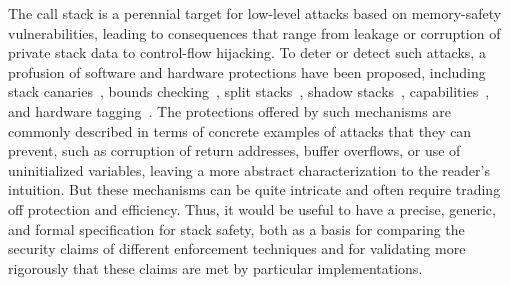 \documentclass[acmsmall,review,anonymous]{acmart}\settopmatter{printfolios=true,printccs=false,printacmref=false}
\begin{document}
The call stack is a perennial target for low-level attacks
based on memory-safety vulnerabilities, leading to consequences
that range from leakage or corruption of private stack data to
control-flow hijacking. To deter or detect such attacks, a profusion of
software and hardware protections have been proposed,
%
including stack canaries~\citep{Cowan+98},
bounds checking~\citep{NagarakatteZMZ09,NagarakatteZMZ10,DeviettiBMZ08},
split stacks~\citep{Kuznetsov+14},
shadow stacks~\citep{Dang+15,Shanbhogue+19},
capabilities~\citep{Woodruff+14,Chisnall+15,Skorstengaard+19,Skorstengaard+19b,Tsampas+19,Georges+21},
and hardware tagging~\citep{DBLP:conf/sp/RoesslerD18}. \ifaftersubmission{}
\fi
%
The protections offered by such mechanisms are commonly described in terms
of concrete examples of attacks that they can prevent, such as corruption
of return addresses, buffer overflows, or use of uninitialized variables,
leaving a more abstract characterization to the reader's intuition.
But these mechanisms can be quite intricate
and often require trading off protection and efficiency.
Thus, it would be useful to have a precise, generic, and formal
specification for stack
safety, both as a basis for comparing the security claims of different
enforcement techniques and for validating more rigorously that these claims
are met by particular implementations.
\end{document}
